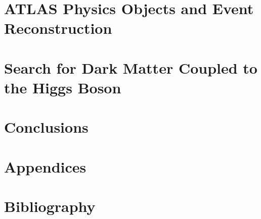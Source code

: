 \documentclass[11pt,openright,oneside,letterpaper,onecolumn]{report} %
\begin{document}
\part{ATLAS Physics Objects and Event Reconstruction}
\label{sec:performance-part}


\part{Search for Dark Matter Coupled to the Higgs Boson}
\label{sec:analysis-part}


\part{Conclusions}
\label{sec:conclusions}


\part{Appendices}
\appendix


\part{Bibliography}
\nocite{*}


\end{document}
